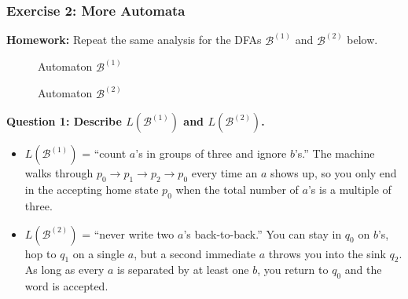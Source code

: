 \documentclass{article}
\theoremstyle{theorem}
\theoremstyle{definition}
\theoremstyle{remark}
\begin{document}
\subsubsection{Exercise 2: More Automata}

\textbf{Homework:} Repeat the same analysis for the DFAs $\mathcal{B}^{(1)}$ and $\mathcal{B}^{(2)}$ below.

\begin{figure}[H]
  \centering
  \caption{Automaton $\mathcal{B}^{(1)}$}
\end{figure}

\begin{figure}[H]
  \centering
  \caption{Automaton $\mathcal{B}^{(2)}$}
\end{figure}

\textbf{Question 1: Describe $L(\mathcal{B}^{(1)})$ and $L(\mathcal{B}^{(2)})$.}

\begin{itemize}
  \item $L(\mathcal{B}^{(1)})$ = “count $a$’s in groups of three and ignore $b$’s.” The machine walks through $p_0 \rightarrow p_1 \rightarrow p_2 \rightarrow p_0$ every time an $a$ shows up, so you only end in the accepting home state $p_0$ when the total number of $a$’s is a multiple of three.
  \item $L(\mathcal{B}^{(2)})$ = “never write two $a$’s back-to-back.” You can stay in $q_0$ on $b$’s, hop to $q_1$ on a single $a$, but a second immediate $a$ throws you into the sink $q_2$. As long as every $a$ is separated by at least one $b$, you return to $q_0$ and the word is accepted.
\end{itemize}
\end{document}
